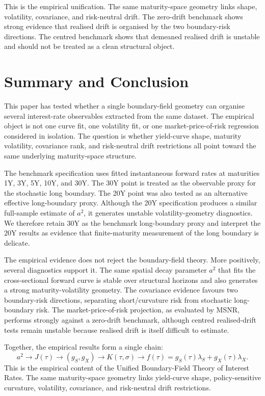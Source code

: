 \documentclass[11pt]{article}
\begin{document}
This is the empirical unification. The same maturity-space geometry links shape, volatility, covariance, and risk-neutral drift. The zero-drift benchmark shows strong evidence that realised drift is organised by the two boundary-risk directions. The centred benchmark shows that demeaned realised drift is unstable and should not be treated as a clean structural object.

\section{Summary and Conclusion}

This paper has tested whether a single boundary-field geometry can organise several interest-rate observables extracted from the same dataset. The empirical object is not one curve fit, one volatility fit, or one market-price-of-risk regression considered in isolation. The question is whether yield-curve shape, maturity volatility, covariance rank, and risk-neutral drift restrictions all point toward the same underlying maturity-space structure.

The benchmark specification uses fitted instantaneous forward rates at maturities 1Y, 3Y, 5Y, 10Y, and 30Y. The 30Y point is treated as the observable proxy for the stochastic long boundary. The 20Y point was also tested as an alternative effective long-boundary proxy. Although the 20Y specification produces a similar full-sample estimate of $a^2$, it generates unstable volatility-geometry diagnostics. We therefore retain 30Y as the benchmark long-boundary proxy and interpret the 20Y results as evidence that finite-maturity measurement of the long boundary is delicate.

The empirical evidence does not reject the boundary-field theory. More positively, several diagnostics support it. The same spatial decay parameter $a^2$ that fits the cross-sectional forward curve is stable over structural horizons and also generates a strong maturity-volatility geometry. The covariance evidence favours two boundary-risk directions, separating short/curvature risk from stochastic long-boundary risk. The market-price-of-risk projection, as evaluated by MSNR, performs strongly against a zero-drift benchmark, although centred realised-drift tests remain unstable because realised drift is itself difficult to estimate.

Together, the empirical results form a single chain:
\begin{equation}
  a^2 \longrightarrow J(\tau) \longrightarrow (g_S,g_X) \longrightarrow K(\tau,\sigma)
  \longrightarrow f(\tau)=g_S(\tau)\lambda_S+g_X(\tau)\lambda_X.
\end{equation}
This is the empirical content of the Unified Boundary-Field Theory of Interest Rates. The same maturity-space geometry links yield-curve shape, policy-sensitive curvature, volatility, covariance, and risk-neutral drift restrictions.
\end{document}
